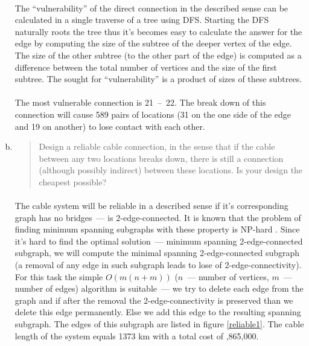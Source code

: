 \begin{enumerate}[(a)]
	\paragraph{}
	The ``vulnerability'' of the direct connection in the described sense can be calculated in a single traverse of a tree using DFS. Starting the DFS naturally roots the tree thus it's becomes easy to calculate the answer for the edge by computing the size of the subtree of the deeper vertex of the edge. The size of the other subtree (to the other part of the edge) is computed as a difference between the total number of vertices and the size of the first subtree. The sought for ``vulnerability'' is a product of sizes of these subtrees.

	\paragraph{}
	The most vulnerable connection is 21~--~22. The break down of this connection will cause 589 pairs of locations (31 on the one side of the edge and 19 on another) to lose contact with each other.

\item \begin{quote}Design a reliable cable connection, in the sense that if the cable between any
two locations breaks down, there is still a connection (although possibly indirect)
between these locations. Is your design the cheapest possible?\end{quote}

	\paragraph{}
	The cable system will be reliable in a described sense if it's corresponding graph has no bridges~--- is 2-edge-connected. It is known that the problem of finding minimum spanning subgraphs with these property is NP-hard \cite{garey79}. Since it's hard to find the optimal solution~--- minimum spanning 2-edge-connected subgraph, we will compute the minimal spanning 2-edge-connected subgraph (a removal of any edge in such subgraph leads to lose of 2-edge-connectivity). For this task the simple $O(m(n+m))$ ($n$~--- number of vertices, $m$~--- number of edges) algorithm is suitable~--- we try to delete each edge from the graph and if after the removal the 2-edge-connectivity is preserved than we delete this edge permanently. Else we add this edge to the resulting spanning subgraph. The edges of this subgraph are listed in figure \ref{reliable1}. The cable length of the system equals 1373 km with a total cost of ,865,000.


\end{enumerate}
